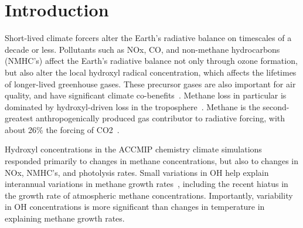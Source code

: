 \section{Introduction}



Short-lived climate forcers alter the Earth's radiative balance on timescales of a decade or less. Pollutants such as NOx, CO, and non-methane hydrocarbons (NMHC's) affect the Earth's radiative balance not only through ozone formation, but also alter the local hydroxyl radical concentration, which affects the lifetimes of longer-lived greenhouse gases. These precursor gases are also important for air quality, and have significant climate co-benefits~\citep{ref:driscoll2015}. Methane loss in particular is dominated by hydroxyl-driven loss in the troposphere~\citep{ref:kirschke2013}. Methane is the second-greatest anthropogenically produced gas contributor to radiative forcing, with about 26\% the forcing of CO2~\citep{ref:myrhe2013}.


Hydroxyl concentrations in the ACCMIP chemistry climate simulations~\citep{ref:voulgarakis2013} responded primarily to changes in methane concentrations, but also to changes in NOx, NMHC's, and photolysis rates. Small variations in OH help explain interannual variations in methane growth rates~\citep{ref:mcnorton2016}, including the recent hiatus in the growth rate of atmospheric methane concentrations. Importantly, variability in OH concentrations is more significant than changes in temperature in explaining methane growth rates.


